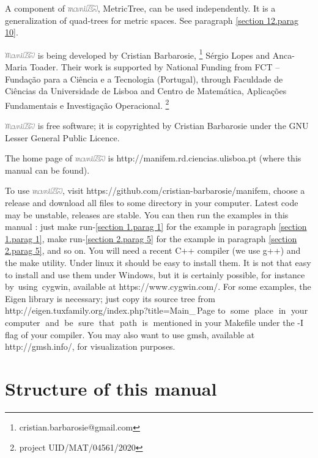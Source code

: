 \documentclass[a4paper]{scrreprt}
\def\numb{}
\newcommand\ManiFEM{\leavevmode\hbox{\includegraphics[width=13mm]{manifem-large}}}
\newcommand\maniFEM{\leavevmode\hbox{\includegraphics[width=13mm]{manifem-small}}}
\renewcommand\tt{\normalfont\ttfamily}
\begin{document}
A component of \maniFEM, {\small\tt MetricTree}, can be used independently.
It is a generalization of quad-trees for metric spaces.
See paragraph \ref{\numb section 12.\numb parag 10}.

{\ManiFEM} is being developed by Cristian Barbarosie,%
\footnote {\small\tt cristian.barbarosie@gmail.com}
S\'ergio Lopes and Anca-Maria Toader.
Their work is supported by National Funding from FCT -- Funda\c c\~ao para a Ci\^encia e a
Tecnologia (Portugal), through Faculdade de Ci\^encias da Universidade de Lisboa and
Centro de Matem\'atica, Aplica\c c\~oes Fundamentais e Investiga\c c\~ao Operacional.%
\footnote{project UID/MAT/04561/2020}

{\ManiFEM} is free software; it is copyrighted by Cristian Barbarosie
under the GNU Lesser General Public Licence.

The home page of {\maniFEM} is
{\small\tt http://manifem.rd.ciencias.ulisboa.pt}
(where this manual can be found).

To use \maniFEM, visit {\small\tt https://github.com/cristian-barbarosie/manifem},
choose a release and download all files to some directory in your computer.
Latest code may be unstable, releases are stable.
You can then run the examples in this manual :
just {\small\tt make run-\ref{\numb section 1.\numb parag 1}}
for the example in paragraph \ref{\numb section 1.\numb parag 1},
{\small\tt make run-\ref{\numb section 2.\numb parag 5}}
for the example in paragraph \ref{\numb section 2.\numb parag 5}, and so on.
You will need a recent {\tt C++} compiler (we use {\tt g++}) and the {\tt make} utility.
Under linux it should be easy to install them.
It is not that easy to install and use them under Windows, but it is certainly possible,
for instance \hbox{by using {\small\tt cygwin}}, available at {\small\tt https://www.cygwin.com/}.
For some examples, the {\small\tt Eigen} library is necessary; just copy its source tree
from {\small\tt http://eigen.tuxfamily.org/index.php?title=Main\_\,Page}
to $\;$some $\;$place $\;$in $\;$your $\;$computer $\;$and $\;$be $\;$sure $\;$that
$\;$path $\;$is $\;$mentioned in your {\small\tt Makefile}
under the {\small\tt -I} flag of your compiler.
You may also want to use {\tt gmsh}, available at {\small\tt http://gmsh.info/},
for visualization purposes.

\section*{Structure of this manual}
\end{document}
